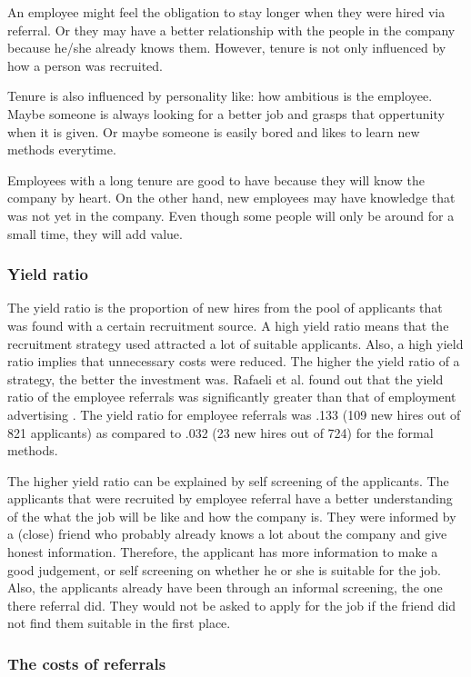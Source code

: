 \documentclass[a4paper, 11pt]{article} %
\begin{document}
An employee might feel the obligation to stay longer when they were hired via referral. Or they may have a better relationship with the people in the company because he/she already knows them. However, tenure is not only influenced by how a person was recruited. 

Tenure is also influenced by personality like: how ambitious is the employee. Maybe someone is always looking for a better job and grasps that oppertunity when it is given. Or maybe someone is easily bored and likes to learn new methods everytime.

Employees with a long tenure are good to have because they will know the company by heart. On the other hand, new employees may have knowledge that was not yet in the company. Even though some people will only be around for a small time, they will add value. 

\subsubsection*{Yield ratio}
The yield ratio is the proportion of new hires from the pool of applicants that was found with a certain recruitment source. A high yield ratio means that the recruitment strategy used attracted a lot of suitable applicants. Also, a high yield ratio implies that unnecessary costs were reduced. The higher the yield ratio of a strategy, the better the investment was. 
Rafaeli et al. found out that the yield ratio of the employee referrals was significantly greater than that of employment advertising \cite{fourth}. The yield ratio for employee referrals was .133 (109 new
hires out of 821 applicants) as compared to .032 (23 new hires out of 724) for the formal methods. 

The higher yield ratio can be explained by self screening of the applicants. The applicants that were recruited by employee referral have a better understanding of the what the job will be like and how the company is. They were informed by a (close) friend who probably already knows a lot about the company and give honest information. Therefore, the applicant has more information to make a good judgement, or self screening on whether he or she is suitable for the job. Also, the applicants already have been through an informal screening, the one there referral did. They would not be asked to apply for the job if the friend did not find them suitable in the first place. 

\subsubsection*{The costs of referrals}
\end{document}

